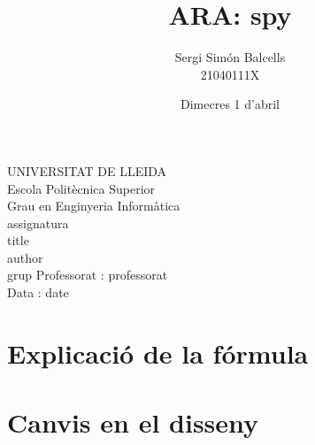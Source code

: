 \documentclass{article}
\title{ARA: spy}
\author{Sergi Simón Balcells\\21040111X}
\date{Dimecres 1 d'abril}
\renewcommand{\maketitle}{ %
	\begin{titlepage}
		\raggedright{UNIVERSITAT DE LLEIDA \\
			Escola Politècnica Superior \\
			Grau en Enginyeria Informàtica\\
			\1assignatura\\}
		\vspace{5cm}
		\centering\huge{\5title \\}
		\vspace{3cm}
		\large{\6author} \\
		\normalsize{\3grup}
		\vfill
		Professorat : \4professorat \\
		Data : \7date
\end{titlepage}}
\begin{document}
	\maketitle
	\thispagestyle{empty}
	
	\newpage
	\tableofcontents
	\newpage
	\section{Explicació de la fórmula}
	
	\section{Canvis en el disseny}
	
\end{document}
